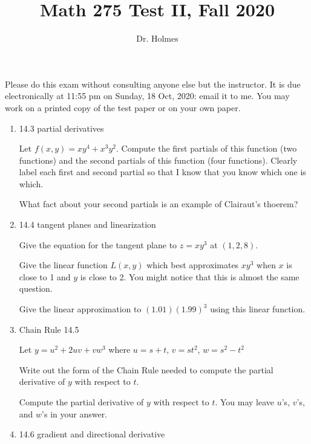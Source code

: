 \documentclass[12pt]{article}
\title{Math 275 Test II, Fall 2020}
\author{Dr. Holmes}
\begin{document}
\maketitle

Please do this exam without consulting anyone else but the instructor.  It is due electronically at 11:55 pm on Sunday, 18 Oct, 2020:  email it to me.  You may work on a printed copy of the test paper or on your own paper.

\newpage

\begin{enumerate}

\item 14.3 partial derivatives

Let $f(x,y) = xy^4 + x^3y^2$.  Compute the first partials of this function (two functions) and the second partials of this function (four functions).    Clearly label each first and second partial so that I know that you know which one is which.

What fact about your second partials is an example of Clairaut's thoerem?

\newpage

\item  14.4 tangent planes and linearization

Give the equation for the tangent plane to $z=xy^3$ at $(1,2,8)$.

\vspace{1.5 in}

Give the linear function $L(x,y)$ which best approximates $xy^3$ when $x$ is close to 1 and $y$ is close to 2.  You might notice that this is almost the same question.


\vspace{1.5 in}

Give the linear approximation to $(1.01)(1.99)^3$ using this linear function.

\newpage

\item  Chain Rule  14.5

Let $y = u^2 + 2uv +vw^3$ where $u=s+t$, $v=st^2$,  $w=s^2-t^2$

Write out the form of the Chain Rule needed to compute the partial derivative of $y$ with respect to $t$.

Compute the partial derivative of $y$ with respect to $t$.  You may
leave $u$'s, $v$'s, and $w$'s in your answer.

\newpage

\item  14.6 gradient and directional derivative


\end{enumerate}
\end{document}
